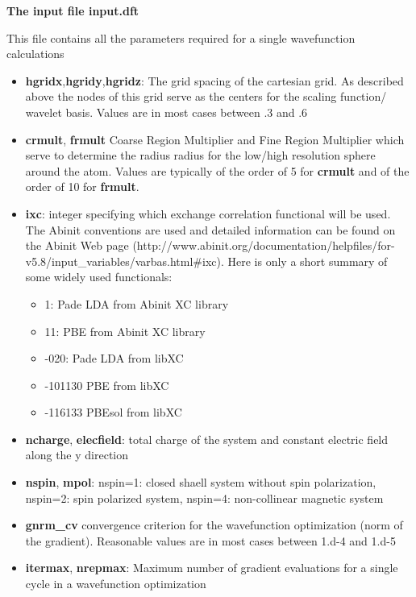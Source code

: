 \documentclass[a4paper,11pt]{report}
\begin{document}
\pagebreak
\begin{center} \large
{ \bf The input file input.dft}
\end{center}
This file contains all the parameters required for a single wavefunction calculations
\begin{itemize}
\item {\bf hgridx},{\bf hgridy},{\bf hgridz}: The grid spacing of the cartesian grid. As 
        described above the nodes of this grid serve as the centers for the scaling function/ wavelet basis. 
       Values are in most cases between .3 and .6

\item {\bf crmult}, {\bf frmult} Coarse Region Multiplier and Fine Region Multiplier which serve to determine the radius
      radius for the low/high resolution sphere around the atom. 
      Values are typically of the order of 5 for {\bf crmult} and of the order of 10 for  {\bf frmult}.
\item {\bf ixc}: integer specifying which exchange correlation functional will be used. The Abinit conventions are 
      used and detailed information can be found on the Abinit Web page 
      (http://www.abinit.org/documentation/helpfiles/for-v5.8/input\_variables/varbas.html\#ixc). 
       Here is only a short summary of some widely used functionals:
      \begin{itemize}
      \item  1: Pade LDA from Abinit XC library
      \item  11: PBE from Abinit XC library
      \item -020: Pade LDA from libXC
      \item -101130  PBE from  libXC
      \item -116133 PBEsol from libXC
      \end{itemize}
\item {\bf ncharge}, {\bf elecfield}: total charge of the system and constant electric field along the y direction
\item {\bf nspin}, {\bf mpol}: nspin=1: closed shaell system without spin polarization, nspin=2: spin polarized 
      system, nspin=4: non-collinear magnetic system
\item {\bf gnrm\_cv} convergence criterion for the wavefunction optimization (norm of the gradient).
      Reasonable values are in most cases between 1.d-4 and 1.d-5
\item {\bf itermax}, {\bf nrepmax}: Maximum number of gradient evaluations for a single cycle in a wavefunction optimization 

\end{itemize}
\end{document}
